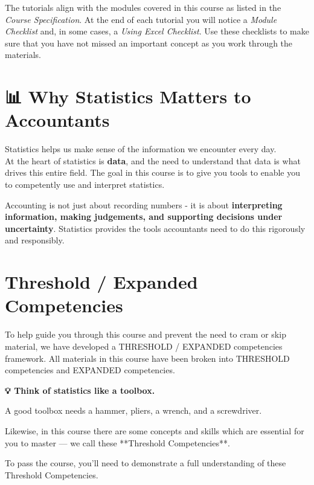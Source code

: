 \documentclass[
  11pt,
  oneside]{scrbook}
\begin{document}
The tutorials align with the modules covered in this course as listed in the \emph{Course Specification}. At the end of each tutorial you will notice a \emph{Module Checklist} and, in
some cases, a \emph{Using Excel Checklist}. Use these checklists to make sure that you have not missed an important concept as you work through the materials.

\section*{📊 Why Statistics Matters to Accountants}\label{why-statistics-matters-to-accountants}

Statistics helps us make sense of the information we encounter every day.\\
At the heart of statistics is \textbf{data}, and the need to understand that data is what drives this entire field. The goal in this course is to give you tools to enable you to competently use and interpret statistics.

Accounting is not just about recording numbers - it is about \textbf{interpreting information, making judgements, and supporting decisions under uncertainty}. Statistics provides the tools accountants need to do this rigorously and responsibly.

\section*{Threshold / Expanded Competencies}\label{threshold-expanded-competencies}

To help guide you through this course and prevent the need to cram or skip material, we have developed a THRESHOLD / EXPANDED competencies framework. All materials in this course have been broken into THRESHOLD competencies and EXPANDED competencies.

\begin{tipbox}
\textbf{💡 Think of statistics like a toolbox.}

A good toolbox needs a hammer, pliers, a wrench, and a screwdriver.

Likewise, in this course there are some concepts and skills which are essential for you to master — we call these **Threshold Competencies**.

To pass the course, you’ll need to demonstrate a full understanding of these Threshold Competencies.
\end{tipbox}
\end{document}
